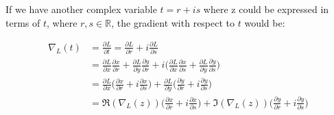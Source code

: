 If we have another complex variable $t=r+is$ where z could be expressed in terms of $t$, where $r,s \in \mathbb{R}$, the gradient with respect to $t$ would be:

\begin{equation}\label{chainchainchain}
\begin{aligned}
\nabla_{L}(t) &= \frac{\partial L}{\partial t} = \frac{\partial L}{\partial r} + i\frac{\partial L}{\partial s}\\
&= \frac{\partial L}{\partial x}\frac{\partial x}{\partial r} + \frac{\partial L}{\partial y}\frac{\partial y}{\partial r}+i\bigg(\frac{\partial L}{\partial x}\frac{\partial x}{\partial s}+\frac{\partial L}{\partial y}\frac{\partial y}{\partial s}\bigg)\\
&= \frac{\partial L}{\partial x}\bigg(\frac{\partial x}{\partial r}+i\frac{\partial x}{\partial s}\bigg)+\frac{\partial L}{\partial y}\bigg(\frac{\partial y}{\partial r}+i\frac{\partial y}{\partial s}\bigg)\\
&= \Re(\nabla_{L}(z))\bigg(\frac{\partial x}{\partial r}+i\frac{\partial x}{\partial s}\bigg)+\Im(\nabla_{L}(z))\bigg(\frac{\partial y}{\partial r}+i\frac{\partial y}{\partial s}\bigg)
\end{aligned}
\end{equation}






